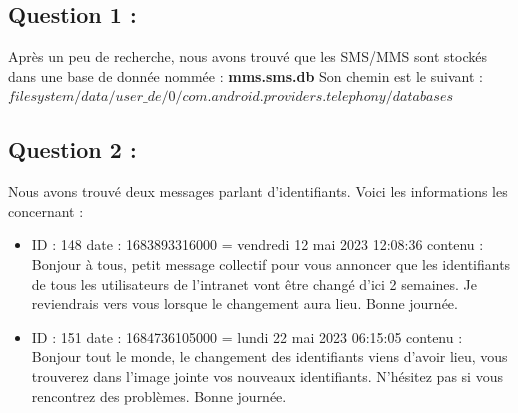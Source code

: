 \documentclass{article}
\begin{document}
    \subsection{Question 1 :}
        Après un peu de recherche, nous avons trouvé que les SMS/MMS sont stockés dans une base de donnée nommée : \textbf{mms.sms.db}\newline
        Son chemin est le suivant : $filesystem/data/user\_de/0/com.android.providers.telephony/databases$
    \subsection{Question 2 :}
        Nous avons trouvé deux messages parlant d'identifiants. Voici les informations les concernant :
        \begin{itemize}
            \item ID : 148\newline
             date : 1683893316000 = vendredi 12 mai 2023 12:08:36\newline
             contenu : Bonjour à tous, petit message collectif pour vous annoncer que les identifiants de tous les utilisateurs de l’intranet vont être changé d’ici 2 semaines. Je reviendrais vers vous lorsque le changement aura lieu. Bonne journée.
            \item ID : 151\newline
             date : 1684736105000 = lundi 22 mai 2023 06:15:05\newline
             contenu : Bonjour tout le monde, le changement des identifiants viens d’avoir lieu, vous trouverez dans l’image jointe vos nouveaux identifiants. N’hésitez pas si vous rencontrez des problèmes. Bonne journée.
        \end{itemize}
\end{document}
